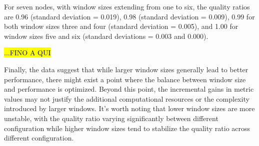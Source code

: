 For seven nodes, with window sizes extending from one to six, the quality ratios are 0.96 (standard deviation = 0.019), 0.98 (standard deviation = 0.009), 0.99 for both window sizes three and four (standard deviation = 0.005), and 1.00 for window sizes five and six (standard deviations = 0.003 and 0.000).

\hl{...FINO A QUI}



Finally, the data suggest that while larger window sizes generally lead to better performance, there might exist a point where the balance between window size and performance is optimized. Beyond this point, the incremental gains in metric values may not justify the additional computational resources or the complexity introduced by larger windows.
It's worth noting that lower window sizes are more unstable, with the quality ratio varying significantly between different configuration while higher window sizes tend to stabilize the quality ratio across different configuration.

